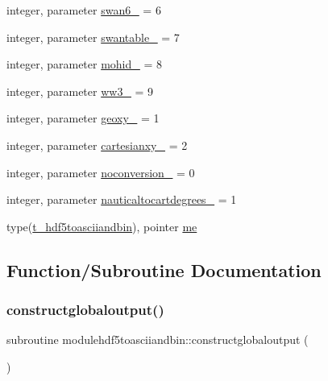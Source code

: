 \begin{DoxyCompactItemize}
\item 
integer, parameter \mbox{\hyperlink{namespacemodulehdf5toasciiandbin_a88daecd90699c02c2b159f06c3e1e735}{swan6\+\_\+}} = 6
\item 
integer, parameter \mbox{\hyperlink{namespacemodulehdf5toasciiandbin_a33258a20c893caf25d6afb6e4ad9f1ae}{swantable\+\_\+}} = 7
\item 
integer, parameter \mbox{\hyperlink{namespacemodulehdf5toasciiandbin_aca2c15fb6f00e7f949460c0795375d92}{mohid\+\_\+}} = 8
\item 
integer, parameter \mbox{\hyperlink{namespacemodulehdf5toasciiandbin_a5e88f7de32dfd93917658a3d32c5f688}{ww3\+\_\+}} = 9
\item 
integer, parameter \mbox{\hyperlink{namespacemodulehdf5toasciiandbin_a0a361be298a23d0cc502f93ca054fb97}{geoxy\+\_\+}} = 1
\item 
integer, parameter \mbox{\hyperlink{namespacemodulehdf5toasciiandbin_af67d5747ca401341575f80bd92bffd79}{cartesianxy\+\_\+}} = 2
\item 
integer, parameter \mbox{\hyperlink{namespacemodulehdf5toasciiandbin_af945d9f20a4ecb4c71cc4cfcfd8af32a}{noconversion\+\_\+}} = 0
\item 
integer, parameter \mbox{\hyperlink{namespacemodulehdf5toasciiandbin_a5aef654a4ed563f0888f41590ac85282}{nauticaltocartdegrees\+\_\+}} = 1
\item 
type(\mbox{\hyperlink{structmodulehdf5toasciiandbin_1_1t__hdf5toasciiandbin}{t\+\_\+hdf5toasciiandbin}}), pointer \mbox{\hyperlink{namespacemodulehdf5toasciiandbin_abb9464da6cd9a0a147fcb62f615a6bdd}{me}}
\end{DoxyCompactItemize}


\subsection{Function/\+Subroutine Documentation}
\mbox{\label{namespacemodulehdf5toasciiandbin_ae2d0b8b9ab26e879bc85d79fd4815b5d}} 
\subsubsection{\texorpdfstring{constructglobaloutput()}{constructglobaloutput()}}
{\footnotesize\ttfamily subroutine modulehdf5toasciiandbin\+::constructglobaloutput (\begin{DoxyParamCaption}{ }\end{DoxyParamCaption})\hspace{0.3cm}{\ttfamily [private]}}

